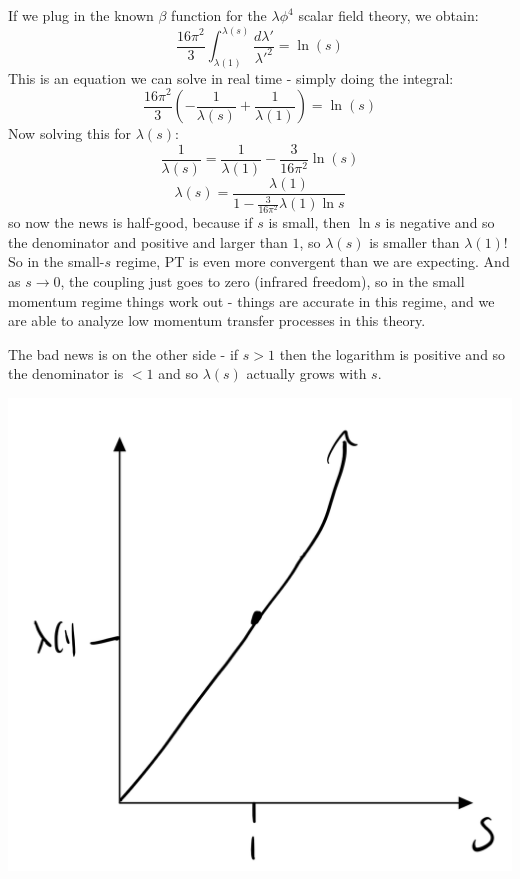 If we plug in the known $\beta$ function for the $\lambda \phi^4$ scalar field theory, we obtain:
\begin{equation}
    \frac{16\pi^2}{3}\int_{\lambda(1)}^{\lambda(s)} \frac{d\lambda'}{\lambda'^2} = \ln(s)
\end{equation}
This is an equation we can solve in real time - simply doing the integral:
\begin{equation}
    \frac{16\pi^2}{3}\left(-\frac{1}{\lambda(s)} + \frac{1}{\lambda(1)}\right) = \ln(s)
\end{equation}
Now solving this for $\lambda(s)$:
\begin{equation}
    \frac{1}{\lambda(s)} = \frac{1}{\lambda(1)} - \frac{3}{16\pi^2}\ln(s)
\end{equation}
\begin{equation}
    \lambda(s) = \frac{\lambda(1)}{1 - \frac{3}{16\pi^2}\lambda(1)\ln s}
\end{equation}
so now the news is half-good, because if $s$ is small, then $\ln s$ is negative and so the denominator and positive and larger than $1$, so $\lambda(s)$ is smaller than $\lambda(1)$! So in the small-$s$ regime, PT is even more convergent than we are expecting. And as $s \to 0$, the coupling just goes to zero (infrared freedom), so in the small momentum regime things work out - things are accurate in this regime, and we are able to analyze low momentum transfer processes in this theory.

The bad news is on the other side - if $s > 1$ then the logarithm is positive and so the denominator is $< 1$ and so $\lambda(s)$ actually grows with $s$.

\begin{center}
    \includegraphics[scale=0.4]{Images/fig-lec30p1.png}
\end{center}

